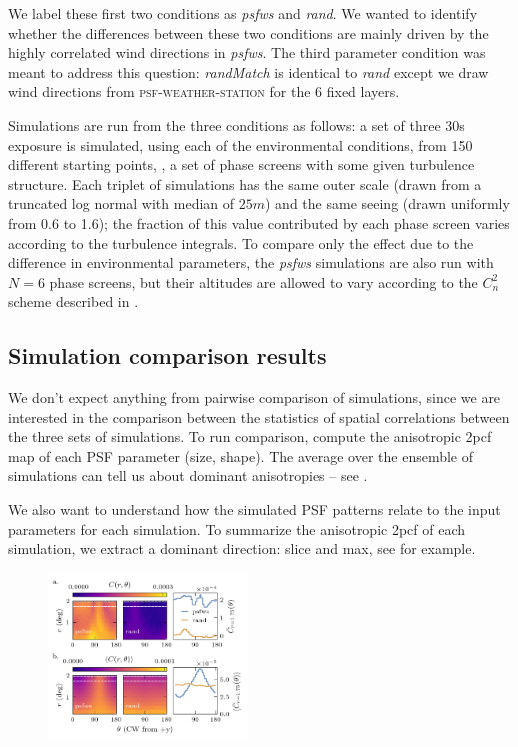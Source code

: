 \documentclass[twocolumn]{aastex631}
\newcommand{\psfws}{\textsc{psf-weather-station}\xspace}
\begin{document}
We label these first two conditions as \textsl{psfws} and \textsl{rand}.
We wanted to identify whether the differences between these two conditions are mainly driven by the highly correlated wind directions in \textsl{psfws}.
The third parameter condition was meant to address this question: \textsl{randMatch} is identical to \textsl{rand} except we draw wind directions from \psfws for the 6 fixed layers.

Simulations are run from the three conditions as follows: a set of three 30\unit{s} exposure is simulated, using each of the environmental conditions, from 150 different starting points, \ie, a set of phase screens with some given turbulence structure. 
Each triplet of simulations has the same outer scale (drawn from a truncated log normal with median of $25\unit{m}$) and the same seeing (drawn uniformly from 0.6 to 1.6\asec); the fraction of this value contributed by each phase screen varies according to the turbulence integrals. 
To compare only the effect due to the difference in environmental parameters, the \textsl{psfws} simulations are also run with $N=6$ phase screens, but their altitudes are allowed to vary according to the $C_n^2$ scheme described in .

\subsection{Simulation comparison results}\label{sec:imsimresults}
We don't expect anything from pairwise comparison of simulations, since we are interested in the comparison between the statistics of spatial correlations between the three sets of simulations.
To run comparison, compute the anisotropic 2pcf map of each PSF parameter (size, shape). 
The average over the ensemble of simulations can tell us about dominant anisotropies -- see .

We also want to understand how the simulated PSF patterns relate to the input parameters for each simulation.
To summarize the anisotropic 2pcf of each simulation, we extract a dominant direction: slice and max, see  for example.

\begin{figure}
\includegraphics[width=0.47\textwidth]{2pcf_to_slice_02.png}
\caption{
    \label{fig:pcfslices}
    }
\end{figure}
\end{document}
